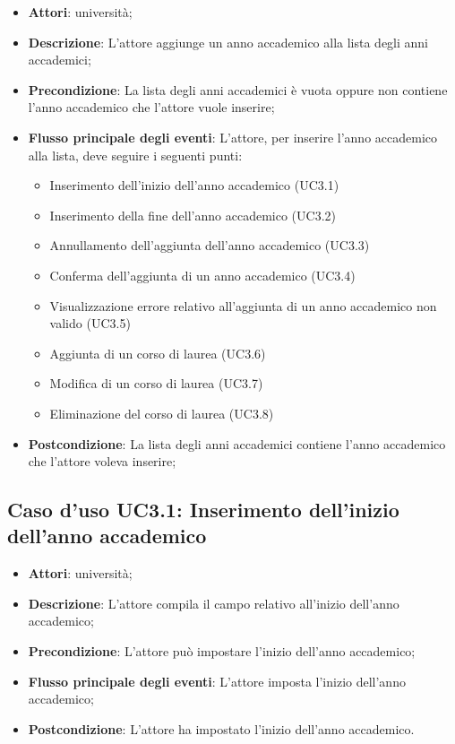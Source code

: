 \begin{itemize}
\item \textbf{Attori}: università;
\item \textbf{Descrizione}: L'attore aggiunge un anno accademico alla lista degli anni accademici;
\item \textbf{Precondizione}: La lista degli anni accademici è vuota oppure non contiene l'anno accademico che l'attore vuole inserire;
\item \textbf{Flusso principale degli eventi}: L'attore, per inserire l'anno accademico alla lista, deve seguire i seguenti punti:
\begin{itemize}
\item Inserimento dell'inizio dell'anno accademico (UC3.1)
\item Inserimento della fine dell'anno accademico (UC3.2)
\item Annullamento dell'aggiunta dell'anno accademico (UC3.3)
\item Conferma dell'aggiunta di un anno accademico (UC3.4)
\item Visualizzazione errore relativo all'aggiunta di un anno accademico non valido (UC3.5)
\item Aggiunta di un corso di laurea (UC3.6)
\item Modifica di un corso di laurea (UC3.7)
\item Eliminazione del corso di laurea (UC3.8)
\end{itemize}
\item \textbf{Postcondizione}: La lista degli anni accademici contiene l'anno accademico che l'attore voleva inserire;
\end{itemize}
\subsection{Caso d'uso \texorpdfstring{UC3.1}{UC3.1}: Inserimento dell'inizio dell'anno accademico}
\begin{itemize}
\item \textbf{Attori}: università;
\item \textbf{Descrizione}: L'attore compila il campo relativo all'inizio dell'anno accademico;
\item \textbf{Precondizione}: L'attore può impostare l'inizio dell'anno accademico;
\item \textbf{Flusso principale degli eventi}: L'attore imposta l'inizio dell'anno accademico;
\item \textbf{Postcondizione}: L'attore ha impostato l'inizio dell'anno accademico.
\end{itemize}
